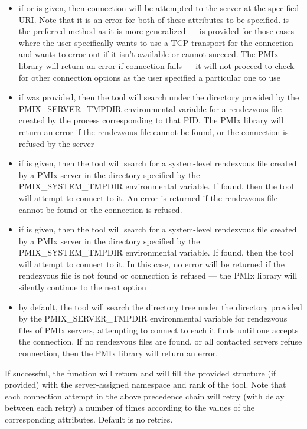 \begin{itemize}
    \item if  or  is given, then connection will be attempted to the server at the specified \ac{URI}. Note that it is an error for both of these attributes to be specified.  is the preferred method as it is more generalized ---  is provided for those cases where the user specifically wants to use a TCP transport for the connection and wants to error out if it isn't available or cannot succeed. The \ac{PMIx} library will return an error if connection fails --- it will not proceed to check for other connection options as the user specified a particular one to use
    \item if  was provided, then the tool will search under the directory provided by the PMIX\_SERVER\_TMPDIR environmental variable for a rendezvous file created by the process corresponding to that \ac{PID}. The \ac{PMIx} library will return an error if the rendezvous file cannot be found, or the connection is refused by the server
    \item if  is given, then the tool will search for a system-level rendezvous file created by a \ac{PMIx} server in the directory specified by the PMIX\_SYSTEM\_TMPDIR environmental variable. If found, then the tool will attempt to connect to it. An error is returned if the rendezvous file cannot be found or the connection is refused.
    \item if  is given, then the tool will search for a system-level rendezvous file created by a \ac{PMIx} server in the directory specified by the PMIX\_SYSTEM\_TMPDIR environmental variable. If found, then the tool will attempt to connect to it. In this case, no error will be returned if the rendezvous file is not found or connection is refused --- the \ac{PMIx} library will silently continue to the next option
    \item by default, the tool will search the directory tree under the directory provided by the PMIX\_SERVER\_TMPDIR environmental variable for rendezvous files of \ac{PMIx} servers, attempting to connect to each it finds until one accepts the connection. If no rendezvous files are found, or all contacted servers refuse connection, then the \ac{PMIx} library will return an error.
\end{itemize}

If successful, the function will return  and will fill the provided structure (if provided) with the server-assigned namespace and rank of the tool. Note that each connection attempt in the above precedence chain will retry (with delay between each retry) a number of times according to the values of the corresponding attributes. Default is no retries.

